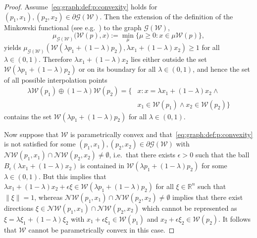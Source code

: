 \documentclass[journal]{IEEEtran}
\theoremstyle{remark}
\theoremstyle{definition}
\begin{document}
%
\begin{proof}
%
Assume~\eqref{eq:graph:def:p:convexity} holds for $(p_1,x_1),(p_2,x_2)\in\partial\mathscr G(\mathcal W)$.
%
Then the extension of the definition of the Minkowski functional (see e.g.~\cite{Rudin:91}) to the graph $\mathscr G(\mathcal W)$,
\[
\mu_{\mathscr G(\mathcal W)} \bigl(
\mathcal W(p), x \bigr)
:= \min_\mu \{\mu \geq 0 : x \in \mu \mathcal W(p)\},
\]
yields $\mu_{\mathscr G(\mathcal W)}\left(\mathcal W(\lambda p_1 + (1-\lambda)p_2),\lambda x_1+(1-\lambda)x_2\right)\geq1$ for all $\lambda\in(0,1)$. Therefore $\lambda x_1 + (1-\lambda) x_2$
lies either outside the set $\mathcal W(\lambda p_1+(1-\lambda)p_2)$ or on its boundary for all $\lambda\in(0,1)$, and hence the set of all possible interpolation points 
%
\[
\begin{split}
  \lambda \mathcal W(p_1)\oplus (1-\lambda)\mathcal W(p_2) = \{&x:x=\lambda x_1 + (1-\lambda) x_2 \wedge\\ &x_1\in\mathcal 
  W(p_1) \wedge x_2\in\mathcal W(p_2)\}
\end{split}
\]
%
contains the set $\mathcal W(\lambda p_1 + (1-\lambda)p_2)$ for all $\lambda\in(0,1)$.
%

Now suppose that $\mathcal W$ is parametrically convex and that~\eqref{eq:graph:def:p:convexity} is not satisfied for 
some $(p_1,x_1),(p_2,x_2)\in\partial\mathscr G(\mathcal W)$ with $\mathcal N\mathcal W(p_1,x_1)\cap\mathcal 
N\mathcal W(p_2,x_2)\neq\emptyset$, 
%
i.e.~that there exists $\epsilon>0$ such that the ball
$B_\epsilon(\lambda x_1 + (1-\lambda)x_2 )$
is contained in $\mathcal W(\lambda p_1 + (1-\lambda)p_2)$ for some $\lambda \in (0,1)$.
%
But this implies that $\lambda x_1 + (1-\lambda) x_2 + \epsilon\xi \in \mathcal W(\lambda p_1+(1-\lambda)p_2)$  for all $\xi\in\mathbb R^n$ such that $\|\xi\| = 1$, whereas
$\mathcal N\mathcal W(p_1,x_1)\cap\mathcal N\mathcal W(p_2,x_2)\neq\emptyset$ implies that there exist directions 
$\xi\in\mathcal N\mathcal W(p_1,x_1)\cap\mathcal N\mathcal W(p_2,x_2)$ which cannot be represented as
$\xi=\lambda \xi_1+
(1-\lambda)\xi_2$
with
$x_1 + \epsilon \xi_1\in\mathcal W(p_1)$ and $x_2  + \epsilon \xi_2\in\mathcal W(p_2)$.
%
It follows that $\mathcal W$ cannot be parametrically convex in this case.
\end{proof}
\end{document}
